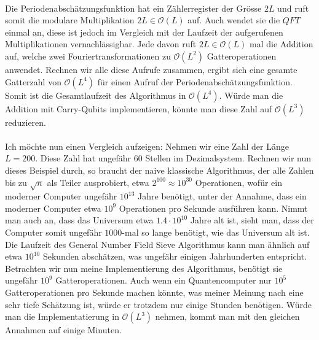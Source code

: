 \paragraph{}
Die Periodenabschätzungsfunktion hat ein Zählerregister der Grösse $2L$ und ruft somit die modulare Multiplikation $2L \in \mathcal O(L)$ auf. Auch wendet sie die $QFT$ einmal an, diese ist jedoch im Vergleich mit der Laufzeit der aufgerufenen Multiplikationen vernachlässigbar. Jede davon ruft $2L \in \mathcal O(L)$ mal die Addition auf, welche zwei Fouriertransformationen zu $\mathcal O(L^2)$ Gatteroperationen anwendet. Rechnen wir alle diese Aufrufe zusammen, ergibt sich eine gesamte Gatterzahl von $\mathcal O(L^4)$ für einen Aufruf der Periodenabschätzungsfunktion. Somit ist die Gesamtlaufzeit des Algorithmus in $\mathcal O(L^4)$. Würde man die Addition mit Carry-Qubits implementieren, könnte man diese Zahl auf $\mathcal O(L^3)$ reduzieren.

\paragraph{}

Ich möchte nun einen Vergleich aufzeigen: Nehmen wir eine Zahl der Länge $L = 200$. Diese Zahl hat ungefähr $60$ Stellen im Dezimalsystem. Rechnen wir nun dieses Beispiel durch, so braucht der naive klassische Algorithmus, der alle Zahlen bis zu $\sqrt{n}$ als Teiler ausprobiert, etwa $2^{100} \approx 10^{30}$ Operationen, wofür ein moderner Computer ungefähr $10^{13}$ Jahre benötigt, unter der Annahme, dass ein moderner Computer etwa $10^9$ Operationen pro Sekunde ausführen kann. Nimmt man auch an, dass das Universum etwa $1.4 \cdot 10^{10}$ Jahre alt ist, sieht man, dass der Computer somit ungefähr $1000$-mal so lange benötigt, wie das Universum alt ist. Die Laufzeit des General Number Field Sieve Algorithmus kann man ähnlich auf etwa $10^{10}$ Sekunden abschätzen, was ungefähr einigen Jahrhunderten entspricht. Betrachten wir nun meine Implementierung des Algorithmus, benötigt sie ungefähr $10^9$ Gatteroperationen. Auch wenn ein Quantencomputer nur $10^5$ Gatteroperationen pro Sekunde machen könnte, was meiner Meinung nach eine sehr tiefe Schätzung ist, würde er trotzdem nur einige Stunden benötigen. Würde man die Implementatierung in $\mathcal O(L^3)$ nehmen, kommt man mit den gleichen Annahmen auf einige Minuten.